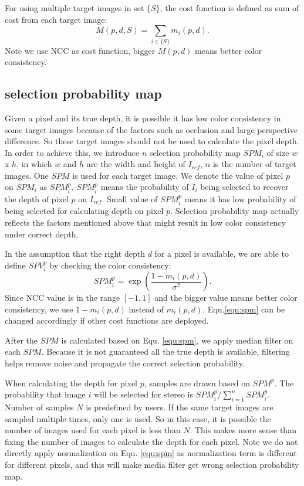 For using multiple target images in set $\{S\}$, the cost function is defined as sum of cost from each target image:
\begin{equation}
    M(p,d,{S}) = \sum_{i\in{\{S\}}}{m_i(p,d)}.\label{equ:totalcost}
\end{equation}
Note we use NCC as cost function, bigger $M(p,d)$ means better color consistency.

\subsection{selection probability map} \label{subsec:spm}
Given a pixel and its true depth, it is possible it has low color consistency in some target images because of the factors such as occlusion and large perspective difference. So these target images should not be used to calculate the pixel depth. In order to achieve this, we introduce $n$ selection probability map $SPM_i$ of size $w$ x $h$, in which $w$ and $h$ are the width and height of $I_{ref}$, $n$ is the number of target images. One $SPM$ is used for each target image. We denote the value of pixel $p$ on $SPM_i$ as $SPM^p_i$. $SPM^p_i$ means the probability of $I_i$ being selected to recover the depth of pixel $p$ on $I_{ref}$. Small value of $SPM^p_i$ means it has low probability of being selected for calculating depth on pixel $p$. Selection probability map actually reflects the factors mentioned above that might result in low color consistency under correct depth.

In the assumption that the right depth $d$ for a pixel is available, we are able to define $SPV^p_i$ by checking the color consistency:
\begin{equation}
    SPM^p_i = \exp(\frac{1 - m_i(p,d)}{\sigma^2}).\label{equ:spm}
\end{equation}
Since NCC value is in the range $[-1, 1]$ and the bigger value means better color consistency, we use $1 - m_i(p,d)$ instead of $m_i(p,d)$. Equ.\ref{equ:spm} can be changed accordingly if other cost functions are deployed.

After the $SPM$ is calculated based on Equ. \ref{equ:spm}, we apply median filter on each $SPM$. Because it is not guaranteed all the true depth is available, filtering helps remove noise and propagate the correct selection probability.

When calculating the depth for pixel $p$, samples are drawn based on $SPM^p$. The probability that image $i$ will be selected for stereo is $SPM^p_i/\sum_{i = 1}^n{SPM^p_i}$. Number of samples $N$ is predefined by users. If the same target images are sampled multiple times, only one is used. So in this case, it is possible the number of images used for each pixel is less than $N$. This makes more sense than fixing the number of images to calculate the depth for each pixel. Note we do not directly apply normalization on Equ. \ref{equ:spm} as normalization term is different for different pixels, and this will make media filter get wrong selection probability map.

